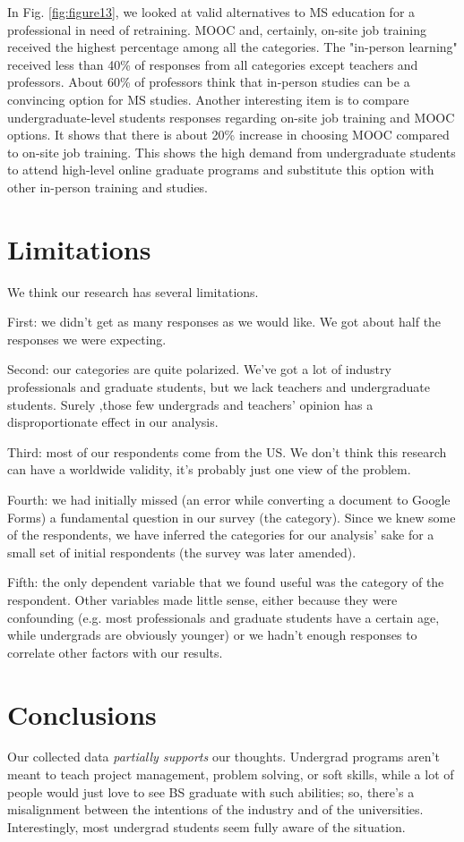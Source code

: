 \documentclass{sigchi}
\begin{document}
In Fig. \ref{fig:figure13}, we looked at valid alternatives to MS education for a professional in need of retraining. MOOC and, certainly, on-site job training received the highest percentage among all the categories. The "in-person learning" received less than 40\% of responses from all categories except teachers and professors. About 60\% of professors think that in-person studies can be a convincing option for MS studies. Another interesting item is to compare undergraduate-level students responses regarding on-site job training and MOOC options. It shows that there is about 20\% increase in choosing MOOC compared to on-site job training. This shows the high demand from undergraduate students to attend high-level online graduate programs and substitute this option with other in-person training and studies.

\section{Limitations}
 We think our research has several limitations.

First: we didn't get as many responses as we would like. We got about half the responses we were expecting.

Second: our categories are quite polarized. We've got a lot of industry professionals and graduate students, but we lack teachers and undergraduate students. Surely ,those few undergrads and teachers' opinion has a disproportionate effect in our analysis.

Third: most of our respondents come from the US. We don't think this research can have a worldwide validity, it's probably just one view of the problem.

Fourth: we had initially missed (an error while converting a document to Google Forms) a fundamental question in our survey (the category). Since we knew some of the respondents, we have inferred the categories for our analysis' sake for a small set of initial respondents (the survey was later amended).

Fifth: the only dependent variable that we found useful was the category of the respondent. Other variables made little sense, either because they were confounding (e.g. most professionals and graduate students have a certain age, while undergrads are obviously younger) or we hadn't enough responses to correlate other factors with our results.

\section{Conclusions}
Our collected data \textit{partially supports} our thoughts. Undergrad programs aren't meant to teach project management, problem solving, or soft skills, while a lot of people would just love to see BS graduate with such abilities; so, there's a misalignment between the intentions of the industry and of the universities. Interestingly, most undergrad students seem fully aware of the situation.
\end{document}
